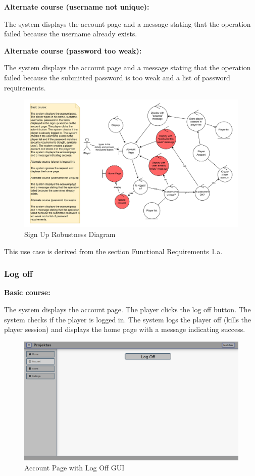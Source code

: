 \documentclass[11pt,a4paper]{article}
\newcommand{\heading}[1]{\vspace{1em}\noindent\textbf{#1}\par\vspace{0.5em}}
\begin{document}
\heading{Alternate course (username not unique):}
The system displays the account page and a message stating that the operation failed because the username already exists.

\heading{Alternate course (password too weak):}
The system displays the account page and a message stating that the operation failed because the submitted password is too weak and a list of password requirements.

\begin{figure}[H]
    \centering
    \includegraphics[width=1\textwidth,keepaspectratio]{robustness/sign_up.drawio.pdf}
    \caption{Sign Up Robustness Diagram}
    \label{fig:sign_up_robustness}
\end{figure}


This use case is derived from the section Functional Requirements 1.a.

\subsubsection{Log off}

\heading{Basic course:}
The system displays the account page. The player clicks the log off button.  The system checks if the player is logged in. The system logs the player off (kills the player session) and displays the home page with a message indicating success.

\begin{figure}[H]
    \centering
    \includegraphics[width=1\textwidth,keepaspectratio]{PSI_3rd_trial/PNGs/log_off.png}
    \caption{Account Page with Log Off GUI}
    \label{fig:log_off}
\end{figure}
\end{document}
